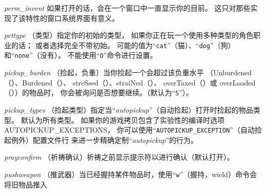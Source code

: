 \documentclass[a4paper, 10pt]{article}
\newcommand{\ib}[1]{\it #1 \hfill}
\begin{document}
\item[\ib{perm\_invent}]
如果打开的话，会在一个窗口中一直显示你的目前\zhTransInventory。
这只对那些实现了该特性的窗口系统界面有意义。
\item[\ib{pettype}]
（\zhTransPets{}类型）指定你的初始\zhTransPets{}的类型，
如果你正在玩一个使用多种\zhTransPets{}类型的角色职业的话；
或者选择完全不带初始\zhTransPets。
可能的值为“{\tt cat}”（猫）、“{\tt dog}”（狗）和“{\tt none}”（没有）。
不能使用“{\tt O}”命令进行设置。
\item[\ib{pickup\_burden}]
（捡起，负重）当你捡起一个会超过该负重水平
（Unburdened（\zhTransUnburdened）、Burdened（\zhTransBurdened）、
streSsed（\zhTransStressed）、straiNed（\zhTransStrained）、
overTaxed（\zhTransOvertaxed）或 overLoaded（\zhTransOverloaded））的物品时，
你会被询问是否想要继续。（默认为“{\tt S}”）。
\item[\ib{pickup\_types}]
（捡起类型）指定当“{\it autopickup\/}”（自动捡起）打开时捡起的物品类型。
默认为所有类型。
如果你的游戏拷贝包含了实验性的编译时选项 AUTOPICKUP\_EXCEPTIONS，
你可以使用“{\tt AUTOPICKUP\_EXCEPTION\/}”（自动捡起例外）配置文件行
来进一步精确定制“{\it autopickup\/}”的行为。
\item[\ib{prayconfirm}]
（祈祷确认）祈祷之前显示提示符以进行确认（默认打开）。
\item[\ib{pushweapon}]
（推武器）当已经握持某件物品时，使用“{\tt w}”（握持，wield）命令会将旧物品推入
\end{document}
